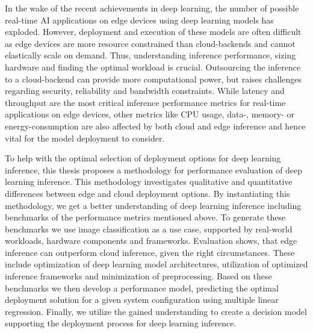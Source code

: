 \noindent In the wake of the recent achievements in deep learning, the number of possible real-time AI applications on edge devices using deep learning models has exploded.
However, deployment and execution of these models are often difficult as edge devices are more resource constrained than cloud-backends and cannot elastically scale on demand.
Thus, understanding inference performance, sizing hardware and finding the optimal workload is crucial.
Outsourcing the inference to a cloud-backend can provide more computational power, but raises challenges regarding security, reliability and bandwidth constraints. 
While latency and throughput are the most critical inference performance metrics for real-time applications on edge devices, other metrics like CPU usage, data-, memory- or energy-consumption are also affected by both cloud and edge inference and hence vital for the model deployment to consider.

To help with the optimal selection of deployment options for deep learning inference, this thesis proposes a methodology for performance evaluation of deep learning inference.
This methodology investigates qualitative and quantitative differences between edge and cloud deployment options.
By instantiating this methodology, we get a better understanding of deep learning inference including benchmarks of the performance metrics mentioned above.
To generate these benchmarks we use image classification as a use case, supported by real-world workloads, hardware components and frameworks.
Evaluation shows, that edge inference can outperform cloud inference, given the right circumstances.
These include optimization of deep learning model architectures, utilization of optimized inference frameworks and minimization of preprocessing.
Based on these benchmarks we then develop a performance model, predicting the optimal deployment solution for a given system configuration using multiple linear regression.
Finally, we utilize the gained understanding to create a decision model supporting the deployment process for deep learning inference.




